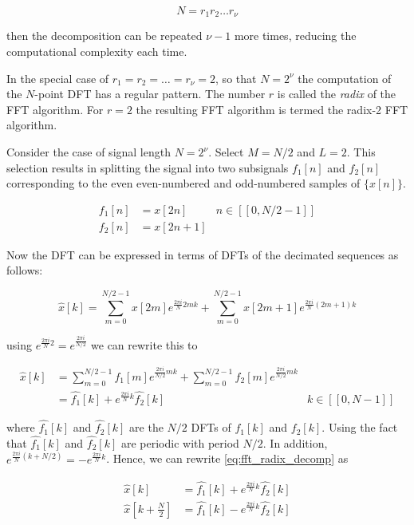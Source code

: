 \begin{equation}
    N = r_1 r_2 \dots r_{\nu}
    \label{eq:n_composite_number}
\end{equation}

then the decomposition can be repeated $\nu - 1$ more times, reducing the computational complexity each time. 

In the special case of $r_1 = r_2 = \dots = r_{\nu} = 2$, so that $N = 2^{\nu}$ the computation of the $N$-point DFT has a regular pattern. The number $r$ is called the \textit{radix}
of the FFT algorithm. For $r=2$ the resulting FFT algorithm is termed the radix-2 FFT algorithm.

Consider the case of signal length $N=2^{\nu}$. Select $M=N/2$ and $L=2$. This selection results in splitting the signal into two subsignals $f_1[n]$ and $f_2[n]$ corresponding 
to the even even-numbered and odd-numbered samples of $\{x[n] \}$.

\begin{align*}
    f_1[n] &= x[2n] & n \in [\![0, N/2-1]\!] \\
    f_2[n] &= x[2n + 1]
\end{align*}

Now the DFT can be expressed in terms of DFTs of the decimated sequences as follows:

\begin{equation}
    \widehat{x}[k] = \sum_{m=0}^{N/2-1}x[2m] e^{\frac{2 \pi i}{N}2mk} + \sum_{m = 0}^{N/2-1} x[2m + 1] e^{\frac{2 \pi i }{N}(2m+1)k}
\end{equation}

using $e^{\frac{2 \pi i }{N}2} = e^{\frac{2 \pi i}{N/2}}$ we can rewrite this to

\begin{align}
    \widehat{x}[k] &= \sum_{m=0}^{N/2-1}f_1[m] e^{\frac{2 \pi i}{N/2}mk} + \sum_{m=0}^{N/2-1}f_2[m] e^{\frac{2 \pi i}{N/2}mk} \\
                   &= \widehat{f_1}[k] + e^{\frac{2 \pi i }{N}k} \widehat{f_2}[k] & k \in [\![0, N-1]\!] \label{eq:fft_radix_decomp}
\end{align}

where $\widehat{f_1}[k]$ and $\widehat{f_2}[k]$ are the $N/2$ DFTs of $f_1[k]$ and $f_2[k]$. Using the fact that $\widehat{f_1}[k]$ and $\widehat{f_2}[k]$ are periodic with 
period $N/2$. In addition, $e^{\frac{2 \pi i}{N}(k+N/2)} = - e^{\frac{2 \pi i}{N}k}$. Hence, we can rewrite \ref{eq:fft_radix_decomp} as 

\begin{align}
    \widehat{x}[k] &= \widehat{f_1}[k] + e^{\frac{2 \pi i}{N}k} \widehat{f_2}[k] \nonumber\\
    \widehat{x}[k + \frac{N}{2}] &= \widehat{f_1}[k] - e^{\frac{2 \pi i}{N}k} \widehat{f_2}[k] \label{eq:fft_butterfly}
\end{align}

